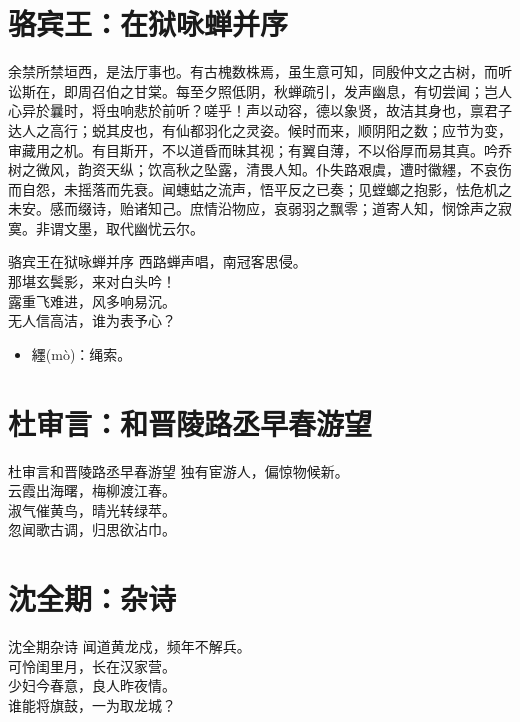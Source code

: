 \documentclass[12pt,oneside,a5paper]{book}
\begin{document}
\chapter{骆宾王：在狱咏蝉并序}
余禁所禁垣西，是法厅事也。有古槐数株焉，虽生意可知，同殷仲文之古树，而听讼斯在，即周召伯之甘棠。每至夕照低阴，秋蝉疏引，发声幽息，有切尝闻；岂人心异於曩时，将虫响悲於前听？嗟乎！声以动容，德以象贤，故洁其身也，禀君子达人之高行；蜕其皮也，有仙都羽化之灵姿。候时而来，顺阴阳之数；应节为变，审藏用之机。有目斯开，不以道昏而昧其视；有翼自薄，不以俗厚而易其真。吟乔树之微风，韵资天纵；饮高秋之坠露，清畏人知。仆失路艰虞，遭时徽纆，不哀伤而自怨，未摇落而先衰。闻蟪蛄之流声，悟平反之已奏；见螳螂之抱影，怯危机之未安。感而缀诗，贻诸知己。庶情沿物应，哀弱羽之飘零；道寄人知，悯馀声之寂寞。非谓文墨，取代幽忧云尔。

\begin{poemzh}{骆宾王}{在狱咏蝉并序}
西路蝉声唱，南冠客思侵。\\
那堪玄鬓影，来对白头吟！\\
露重飞难进，风多响易沉。\\
无人信高洁，谁为表予心？\\ 
\end{poemzh}

\begin{itemize}
\item 纆(mò)：绳索。
\end{itemize}

\chapter{杜审言：和晋陵路丞早春游望}
\begin{poemzh}{杜审言}{和晋陵路丞早春游望}
独有宦游人，偏惊物候新。\\
云霞出海曙，梅柳渡江春。\\
淑气催黄鸟，晴光转绿苹。\\
忽闻歌古调，归思欲沾巾。\\ 
\end{poemzh}

\chapter{沈全期：杂诗}
\begin{poemzh}{沈全期}{杂诗}
闻道黄龙戍，频年不解兵。\\
可怜闺里月，长在汉家营。\\
少妇今春意，良人昨夜情。\\
谁能将旗鼓，一为取龙城？\\ 
\end{poemzh}
\end{document}
